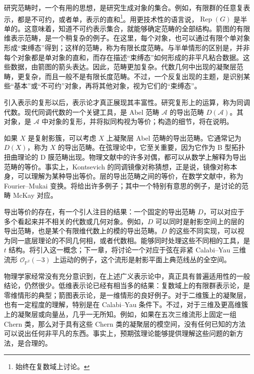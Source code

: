 研究范畴时，一个有用的思想，是研究生成对象的集合。例如，有限群的任意复表示，都是不可约，或者单，表示的直和\footnote{始终在复数域上讨论。}。用更技术性的语言说，$\operatorname{Rep}(G)$ 是半单的。这意味着，知道不可约表示集合，就能够确定范畴的全部结构。箭图的有限维表示范畴，是一个稍复杂的例子。在这里，每个对象，也可以通过有限个单对象形成“束缚态”得到；这样的范畴，称为有限长度范畴。与半单情形的区别是，并非每个对象都是单对象的直和，而存在描述“束缚态”如何形成的非平凡粘合数据。这些数据，由箭图的箭头表达。因此，范畴更加复杂。代数几何中出现的凝聚层范畴，更复杂，而且一般不是有限长度范畴。不过，一个反复出现的主题，是识别某些“基本”或“不可约”对象，再将其他对象，视为它们的“束缚态”。

引入表示的复形以后，表示论才真正展现其丰富性。研究复形上的运算，称为同调代数。现代同调代数的一个关键工具，是 Abel 范畴 $\mathcal{A}$ 的导出范畴 $D(\mathcal{A})$。其对象，是 $\mathcal{A}$ 中对象的复形，并将拟同构视为等价；构造的细节，将在说明。

如果 $X$ 是复射影簇，可以考虑 $X$ 上凝聚层 Abel 范畴的导出范畴。它通常记为 $D(X)$，称为 $X$ 的导出范畴。在弦理论中，它至关重要，因为它作为 B 型拓扑扭曲理论的 D 膜范畴出现。物理文献中的许多对偶，都可以从数学上解释为导出范畴的等价。事实上，Kontsevich 的同调镜像对称猜想，正是说，镜像对称本身，可以理解为某种导出等价。层的导出范畴之间的等价，在数学文献中，称为 Fourier--Mukai 变换。将给出许多例子；其中一个特别有意思的例子，是讨论的范畴 McKay 对应。

导出等价的存在，有一个引人注目的结果：一个固定的导出范畴 $D$，可以对应于多个看起来并不相关的代数或几何对象。例如，$D$ 可以同时是射影空间上的层的导出范畴，也是某个有限维代数上的模的导出范畴。$D$ 的这些不同实现，可以视为同一底层理论的不同几何相，或者代数相。能够同时处理这些不同相的工具，是 $t$ 结构。将引入这一概念；下一章，将讨论一个对应于弦在非紧 Calabi--Yau 三维流形 $\mathcal{O}_{\mathbb{P}^2}(-3)$ 上运动的例子，这个流形是射影平面上典范线丛的全空间。

物理学家经常没有充分意识到，在上述广义表示论中，真正具有普遍适用性的一般结论，仍然很少。低维表示论已经有相当多的结果：复数域上的有限群表示论，是零维情形的典型；箭图表示论，是一维情形的良好例子。对于二维簇上的凝聚层，也有一定程度的理解，特别是在 Calabi--Yau 条件下。不过，对于三维及更高维簇上的凝聚层或向量丛，几乎一无所知。例如，如果在五次三维流形上固定一组 Chern 类，那么对于具有这些 Chern 类的凝聚层的模空间，没有任何已知的方法可以说出任何非平凡的东西。事实上，预期弦理论能够提供理解这些问题的新方法，是合理的。

